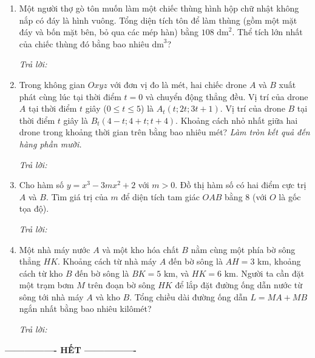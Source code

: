 \documentclass[12pt,a4paper]{article}
\newcommand{\otraloi}{\par\nobreak\smallskip\noindent\textit{Trả lời:}\quad\fbox{\rule{0pt}{11pt}\makebox[0.3cm]{}}\,\fbox{\rule{0pt}{11pt}\makebox[0.3cm]{}}\,\fbox{\rule{0pt}{11pt}\makebox[0.3cm]{}}\,\fbox{\rule{0pt}{11pt}\makebox[0.3cm]{}}}
\begin{document}
\newpage
\begin{enumerate}[start=3]
\item Một người thợ gò tôn muốn làm một chiếc thùng hình hộp chữ nhật không nắp có đáy là hình vuông. Tổng diện tích tôn để làm thùng (gồm một mặt đáy và bốn mặt bên, bỏ qua các mép hàn) bằng $108\text{ dm}^2$. Thể tích lớn nhất của chiếc thùng đó bằng bao nhiêu $\text{dm}^3$?
\begin{center}
\end{center}
\otraloi

\item Trong không gian $Oxyz$ với đơn vị đo là mét, hai chiếc drone $A$ và $B$ xuất phát cùng lúc tại thời điểm $t=0$ và chuyển động thẳng đều. Vị trí của drone $A$ tại thời điểm $t$ giây ($0\le t\le5$) là $A_t(t;2t;3t+1)$. Vị trí của drone $B$ tại thời điểm $t$ giây là $B_t(4-t;4+t;t+4)$. Khoảng cách nhỏ nhất giữa hai drone trong khoảng thời gian trên bằng bao nhiêu mét? \textit{Làm tròn kết quả đến hàng phần mười.}
\otraloi

\item Cho hàm số $y=x^3-3mx^2+2$ với $m>0$. Đồ thị hàm số có hai điểm cực trị $A$ và $B$. Tìm giá trị của $m$ để diện tích tam giác $OAB$ bằng $8$ (với $O$ là gốc tọa độ).
\otraloi

\item Một nhà máy nước $A$ và một kho hóa chất $B$ nằm cùng một phía bờ sông thẳng $HK$. Khoảng cách từ nhà máy $A$ đến bờ sông là $AH=3\text{ km}$, khoảng cách từ kho $B$ đến bờ sông là $BK=5\text{ km}$, và $HK=6\text{ km}$. Người ta cần đặt một trạm bơm $M$ trên đoạn bờ sông $HK$ để lắp đặt đường ống dẫn nước từ sông tới nhà máy $A$ và kho $B$. Tổng chiều dài đường ống dẫn $L=MA+MB$ ngắn nhất bằng bao nhiêu kilômét?
\begin{center}
\end{center}
\otraloi
\end{enumerate}
\begin{center}\textbf{---------------- HẾT ----------------}\end{center}
\end{document}
